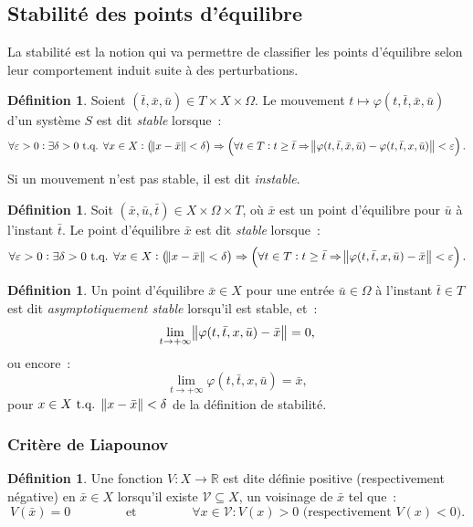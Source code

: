 \documentclass{article}
\theoremstyle{definition}
\newtheorem{déf}[thm]{Définition}
\theoremstyle{remark}
\newcommand{\R}{\mathbb R}
\newcommand{\tq}{\text{ t.q. }}
\begin{document}
	\subsection{Stabilité des points d'équilibre}

	La stabilité est la notion qui va permettre de classifier les points d'équilibre selon leur comportement induit suite à des perturbations.

	\begin{déf} Soient $(\bar t, \bar x, \bar u) \in T \times X \times \Omega$. Le mouvement $t \mapsto \varphi(t, \bar t, \bar x, \bar u)$ d'un système $S$
	est dit \textit{stable} lorsque~:
	\[\forall \varepsilon > 0 : \exists \delta > 0 \tq \forall x \in X : \left(\norm {x-\bar x} < \delta\right) \Rightarrow
		\left(\forall t \in T : t \geq \bar t \Rightarrow \norm {\varphi(t, \bar t, \bar x, \bar u) - \varphi(t, \bar t, x, \bar u)} < \varepsilon\right).\]

	Si un mouvement n'est pas stable, il est dit \textit{instable}.
	\end{déf}

	\begin{déf} Soit $(\bar x, \bar u, \bar t) \in X \times \Omega \times T$, où $\bar x$ est un point d'équilibre pour $\bar u$ à l'instant $\bar t$.
	Le point d'équilibre $\bar x$ est dit \textit{stable} lorsque~:
	\[\forall \varepsilon > 0 : \exists \delta > 0 \tq \forall x \in X : \left(\norm {x-\bar x} < \delta\right) \Rightarrow
		\left(\forall t \in T : t \geq \bar t \Rightarrow \norm {\varphi(t, \bar t, x, \bar u) - \bar x} < \varepsilon\right).\]
	\end{déf}

	\begin{déf} Un point d'équilibre $\bar x \in X$ pour une entrée $\bar u \in \Omega$ à l'instant $\bar t \in T$ est dit \textit{asymptotiquement stable}
	lorsqu'il est stable, et~:
	\[\lim_{t \to +\infty}\norm {\varphi(t, \bar t, x, \bar u) - \bar x} = 0,\]
	ou encore~:
	\[\lim_{t \to +\infty}\varphi(t, \bar t, x, \bar u) = \bar x,\]
	pour $x \in X \tq \norm {x-\bar x} < \delta$ de la définition de stabilité.
	\end{déf}

		\subsubsection{Critère de Liapounov}

	\begin{déf} Une fonction $V : X \to \R$ est dite définie positive (respectivement négative) en $\bar x \in X$ lorsqu'il existe $\mathcal V \subseteq X$, un
	voisinage de $\bar x$ tel que~:
	\[V(\bar x) = 0 \qquad\qquad \text{ et } \qquad\qquad \forall x \in \mathcal V : V(x) > 0 \text{ (respectivement $V(x) < 0$)}.\]
	\end{déf}
\end{document}
